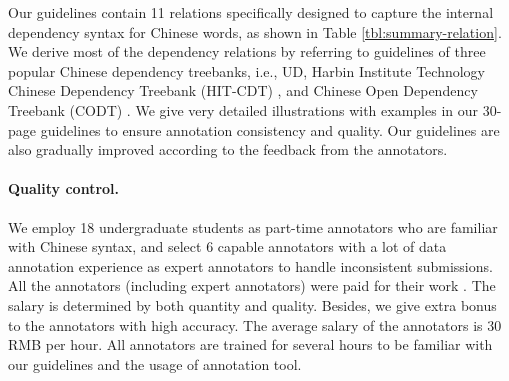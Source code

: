 

Our guidelines contain 11 relations specifically designed to capture the internal dependency syntax for Chinese words, as shown in Table \ref{tbl:summary-relation}. 
We derive most of the dependency relations by referring to guidelines of three popular Chinese dependency treebanks, i.e., UD, Harbin Institute Technology Chinese Dependency Treebank (HIT-CDT) \cite{HIT-CDT}, and Chinese Open Dependency Treebank (CODT) \cite{li-etal-2019-semi-supervised}. 
We give very detailed illustrations with examples in our 30-page guidelines to ensure annotation consistency and quality. 
Our guidelines are also gradually improved according to the feedback from the annotators. 

\paragraph{Quality control.} 
We employ 18 undergraduate students as part-time annotators who are familiar with Chinese syntax, and select 6 capable annotators with a lot of data annotation experience as expert annotators 
to handle inconsistent submissions. %
All the annotators (including expert annotators) were paid for their work . 
The salary is determined by both quantity and quality. Besides, we give extra bonus to the annotators with high accuracy. The average salary of the annotators is 30 RMB per hour.
All annotators are trained %
for several hours to be familiar with our guidelines and the usage of annotation tool. 

